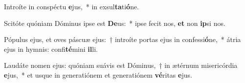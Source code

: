 \item Introíte in conspéctu \textbf{e}jus,~* in exsul\textbf{ta}ti\textbf{ó}ne.
\item Scitóte quóniam Dóminus ipse est \textbf{De}us:~* ipse fecit nos, \textbf{et} non \textbf{ip}si nos.
\item Pópulus ejus, et oves páscuæ ejus:~† introíte portas ejus in confessi\textbf{ó}ne,~* átria ejus in hymnis: confi\textbf{té}mini \textbf{il}li.
\item Laudáte nomen ejus: quóniam suávis est Dóminus,~† in ætérnum misericórdia \textbf{e}jus,~* et usque in generatiónem et generatiónem \textbf{vé}ritas \textbf{e}jus.

